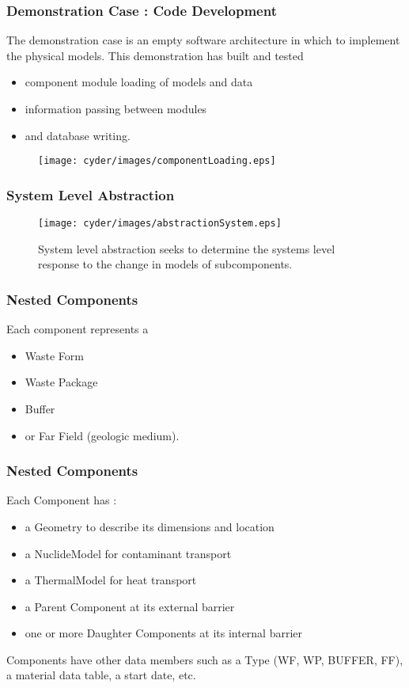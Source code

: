 
\begin{frame}[ctb!]
  \frametitle{Demonstration Case : Code Development}
  \footnotesize{
  The demonstration case is an empty software architecture in which to implement 
  the physical models. This demonstration has built and tested
  \begin{itemize}
    \item component module loading of models and data
    \item information passing between modules
    \item and database writing.
  \end{itemize}
  }
  \begin{figure}[htbp!]
    \begin{center}
      \texttt{[image: cyder/images/componentLoading.eps]}
    \end{center}
  \end{figure}
\end{frame}

\begin{frame}[ctb!]
  \frametitle{System Level Abstraction}
  \begin{figure}[h!]
      \texttt{[image: cyder/images/abstractionSystem.eps]}
    \caption{System level abstraction seeks to determine the systems level 
    response to the change in models of subcomponents.}
  \end{figure}
\end{frame}

\begin{frame}
  \frametitle{Nested Components}
  Each component represents a 
  \begin{itemize}
    \item Waste Form
    \item Waste Package
    \item Buffer
    \item or Far Field (geologic medium).
  \end{itemize}
\end{frame}


\begin{frame}
  \frametitle{Nested Components}
  Each Component has : 
  \begin{itemize}
    \item a Geometry to describe its dimensions and location
    \item a NuclideModel for contaminant transport 
    \item a ThermalModel for heat transport
    \item a Parent Component at its external barrier
    \item one or more Daughter Components at its internal barrier
  \end{itemize}

  Components have other data members such as a Type (WF, WP, BUFFER, FF), a 
  material data table, a start date, etc. 
\end{frame}

